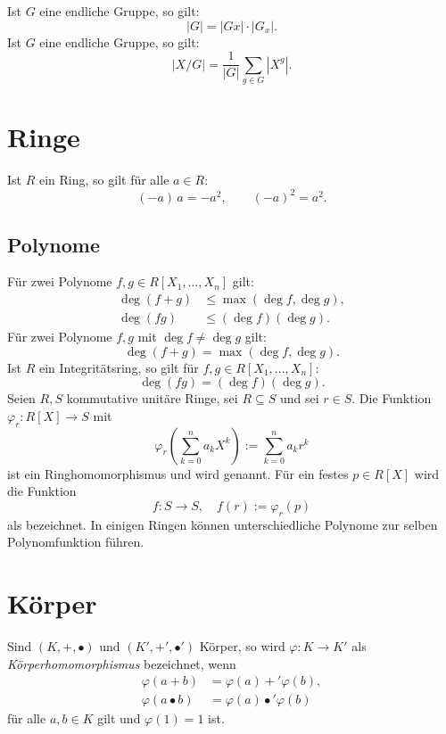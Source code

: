 \noindent
{}
Ist $G$ eine endliche Gruppe, so gilt:
\begin{equation}
|G| = |Gx|\cdot |G_x|.
\end{equation}
Ist $G$ eine endliche Gruppe, so gilt:
\begin{equation}
|X/G| = \frac{1}{|G|}\sum_{g\in G}|X^g|.
\end{equation}

\section{Ringe}
Ist $R$ ein Ring, so gilt für alle $a\in R$:
\begin{equation}
(-a)\,a = -a^2,\qquad (-a)^2=a^2.
\end{equation}

\subsection{Polynome}
Für zwei Polynome $f,g\in R[X_1,\ldots,X_n]$ gilt:
\begin{align}
\deg(f+g)&\le \max(\deg f,\deg g),\\
\deg(fg)&\le (\deg f)(\deg g).
\end{align}
Für zwei Polynome $f,g$ mit $\deg f\ne\deg g$ gilt:
\begin{equation}
\deg(f+g) = \max(\deg f,\deg g).
\end{equation}
Ist $R$ ein Integritätsring, so gilt für $f,g\in R[X_1,\ldots,X_n]$:%
\begin{equation}
\deg(fg) = (\deg f)(\deg g).
\end{equation}
Seien $R,S$ kommutative unitäre Ringe, sei $R\subseteq S$
und sei $r\in S$.
Die Funktion $\varphi_r\colon R[X]\to S$ mit
\begin{equation}\textstyle
\varphi_r(\sum_{k=0}^n a_k X^k):=\sum_{k=0}^n a_k r^k 
\end{equation}
ist ein Ringhomomorphismus und wird
genannt. Für ein festes $p\in R[X]$ wird die Funktion
\begin{equation}
f\colon S\to S,\quad f(r):=\varphi_r(p)
\end{equation}
als  bezeichnet. In einigen Ringen können
unterschiedliche Polynome zur selben Polynomfunktion führen.

\section{Körper}
\begin{Definition}
Sind $(K,+,\bullet)$ und $(K',+',\bullet')$ Körper, so
wird $\varphi\colon K\to K'$ als \emph{Körperhomomorphismus}
bezeichnet, wenn
\begin{align}
\varphi(a+b) &= \varphi(a)+'\varphi(b),\\
\varphi(a\bullet b) &= \varphi(a)\bullet'\varphi(b)
\end{align}
für alle $a,b\in K$ gilt und $\varphi(1)=1$ ist.
\end{Definition}


